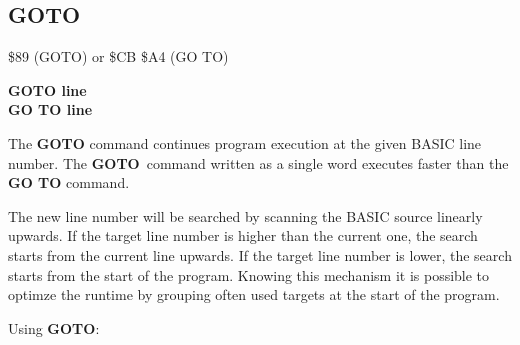 \newpage
\subsection{GOTO}
\begin{description}[leftmargin=3cm,style=nextline]
\item [Token:] \$89 (GOTO) or \$CB \$A4 (GO TO)
\item [Format:] {\bf GOTO line} \\
                {\bf GO TO line}
\item [Usage:] The {\bf GOTO}
               command continues program
               execution at the given BASIC line number.
               The {\bf GOTO} command written as a single
               word executes faster than the {\bf GO TO} command.

\item [Remarks:] The new line number will be searched by scanning
               the BASIC source linearly upwards. If the target
               line number is higher than the current one, the
               search starts from the current line upwards.
               If the target line number is lower, the search starts
               from the start of the program.
               Knowing this mechanism it is possible to optimze
               the runtime by grouping often used targets at the
               start of the program.

\item [Example:] Using {\bf GOTO}:
\end{description}


\newpage
